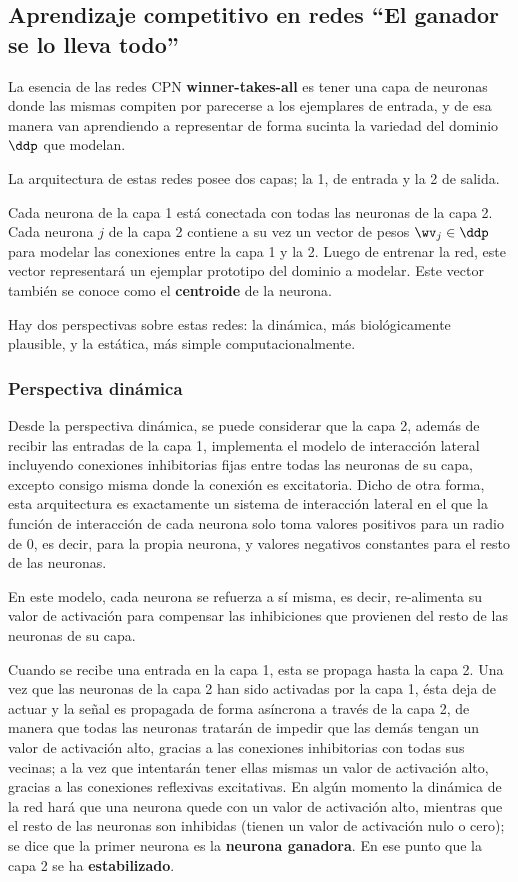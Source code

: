 \subsection{Aprendizaje competitivo en redes ``El ganador se lo lleva todo''}

La esencia de las redes CPN \textbf{winner-takes-all} es tener una capa de neuronas donde las mismas compiten por parecerse a los ejemplares de entrada, y de esa manera van aprendiendo a representar de forma sucinta la variedad del dominio $\ddp$ que modelan.

La arquitectura de estas redes posee dos capas; la 1, de entrada y la 2 de salida.

Cada neurona de la capa 1 está conectada con todas las neuronas de la capa 2. Cada neurona $j$ de la capa 2 contiene a su vez un vector de pesos $\wv_j \in \ddp$ para modelar las conexiones entre la capa 1 y la 2. Luego de entrenar la red, este vector representará un ejemplar prototipo del dominio a modelar. Este vector también se conoce como el \textbf{centroide} de la neurona.

Hay dos perspectivas sobre estas redes: la dinámica, más biológicamente plausible, y la estática, más simple computacionalmente.

\subsubsection*{Perspectiva dinámica}

Desde la perspectiva dinámica, se puede considerar que la capa 2, además de recibir las entradas de la capa 1, implementa el modelo de interacción lateral incluyendo conexiones inhibitorias fijas entre todas las neuronas de su capa, excepto consigo misma donde la conexión es excitatoria. Dicho de otra forma, esta arquitectura es exactamente un sistema de interacción lateral en el que la función de interacción de cada neurona solo toma valores positivos para un radio de 0, es decir, para la propia neurona, y valores negativos constantes para el resto de las neuronas. 

En este modelo, cada neurona se refuerza a sí misma, es decir, re-alimenta su valor de activación para compensar las inhibiciones que provienen del resto de las neuronas de su capa.


 
Cuando se recibe una entrada en la capa 1, esta se propaga hasta la capa 2. Una vez que las neuronas de la capa 2 han sido activadas por la capa 1, ésta deja de actuar y la señal es propagada de forma asíncrona a través de la capa 2, de manera que todas las neuronas tratarán de impedir que las demás tengan un valor de activación alto, gracias a las conexiones inhibitorias con todas sus vecinas; a la vez que intentarán tener ellas mismas un valor de activación alto, gracias a las conexiones reflexivas excitativas. En algún momento la dinámica de la red hará que una neurona quede con un valor de activación alto, mientras que el resto de las neuronas son inhibidas (tienen un valor de activación nulo o cero); se dice que la primer neurona es la \textbf{neurona ganadora}. En ese punto que la capa 2 se ha \textbf{estabilizado}.

